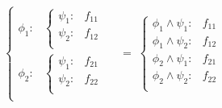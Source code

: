 \documentclass[letterpaper]{article}
\begin{document}
\begin{enumerate}
\begin{align*}
    \begin{cases}
      \phi_1: & 
        \begin{cases}
          \psi_1: & f_{11} \\ 
          \psi_2: & f_{12}  \\ 
        \end{cases} \\
      \phi_2: & 
        \begin{cases}
          \psi_1: & f_{21} \\ 
          \psi_2: & f_{22}  \\ 
        \end{cases} \\
    \end{cases} & \; = \;
        \begin{cases}
          \phi_1 \land \psi_1: & f_{11} \\ 
          \phi_1 \land \psi_2: & f_{12}  \\ 
          \phi_2 \land \psi_1: & f_{21} \\ 
          \phi_2 \land \psi_2: & f_{22}  \\ 
        \end{cases} 
\end{align*}


\end{enumerate}
\end{document}
